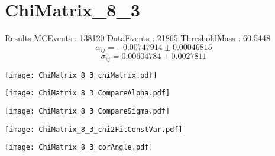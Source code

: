 \documentclass[a4paper,12pt]{article}
\begin{document}
\section{ChiMatrix\_8\_3}
\begin{minipage}{0.49\linewidth} Results \newline
MCEvents : 138120\newline
DataEvents : 21865 \newline
ThresholdMass : 60.5448\\
$$\alpha_{ij} = -0.00747914\pm 0.00046815$$
$$\sigma_{ij} = 0.00604784\pm 0.0027811$$
\end{minipage}\hfill
\begin{minipage}{0.49\linewidth} 
\texttt{[image: ChiMatrix\_8\_3\_chiMatrix.pdf]}\\
\end{minipage}
\hfill
\begin{minipage}{0.49\linewidth} 
\texttt{[image: ChiMatrix\_8\_3\_CompareAlpha.pdf]}\\
\end{minipage}
\hfill
\begin{minipage}{0.49\linewidth} 
\texttt{[image: ChiMatrix\_8\_3\_CompareSigma.pdf]}\\
\end{minipage}
\begin{minipage}{0.49\linewidth} 
\texttt{[image: ChiMatrix\_8\_3\_chi2FitConstVar.pdf]}\\
\end{minipage}
\hfill
\begin{minipage}{0.49\linewidth} 
\texttt{[image: ChiMatrix\_8\_3\_corAngle.pdf]}\\
\end{minipage}
\end{document}
